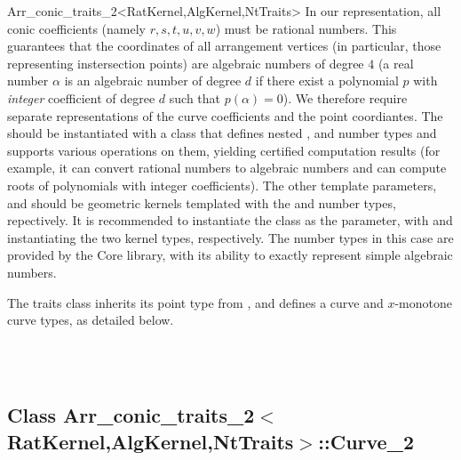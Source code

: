 \begin{ccRefClass}{Arr_conic_traits_2<RatKernel,AlgKernel,NtTraits>}
In our representation, all conic coefficients (namely $r, s, t, u, v, w$)
must be rational numbers. This guarantees that the coordinates of all
arrangement vertices (in particular, those representing instersection
points) are algebraic numbers of degree $4$ (a real number $\alpha$
is an algebraic number of degree $d$ if there exist a polynomial $p$ with
{\sl integer} coefficient of degree $d$ such that $p(\alpha) = 0$).
We therefore require separate representations of the curve coefficients and
the point coordiantes. The  should be instantiated with a class
that defines nested ,  and 
number types and supports various operations on them, yielding certified
computation results (for example, it can convert rational numbers to algebraic
numbers and can compute roots of polynomials with integer coefficients).
The other template parameters,  and  should be
geometric kernels templated with the  and
 number types, repectively.
It is recommended to instantiate the 
class as the  parameter, with
 and 
instantiating the two kernel types, respectively.
The number types in this case are provided by the {\sc Core} library, with its
ability to exactly represent simple algebraic numbers.

The traits class inherits its point type from ,
and defines a curve and $x$-monotone curve types, as detailed below.

 
\ccIsModel
     \\
     \\

\ccTypes



\subsection*{Class 
        Arr\_conic\_traits\_2$<$RatKernel,AlgKernel,NtTraits$>$::Curve\_2}


\end{ccRefClass}

